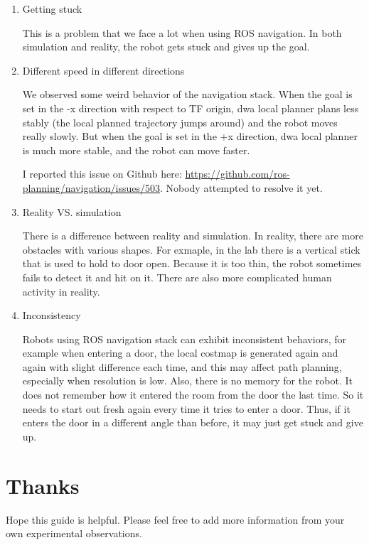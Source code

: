 \documentclass[12pt]{article}
\begin{document}
\begin{enumerate}
\item Getting stuck

This is a problem that we face a lot when using ROS navigation. In both simulation and reality, the robot gets stuck and gives up the goal. 

\item Different speed in different directions

We observed some weird behavior of the navigation stack. When the goal is set in the -x direction with respect to TF origin, dwa local planner plans less stably (the local planned trajectory jumps around) and the robot moves really slowly. But when the goal is set in the +x direction, dwa local planner is much more stable, and the robot can move faster.

I reported this issue on Github here: \url{https://github.com/ros-planning/navigation/issues/503}. Nobody attempted to resolve it yet.

\item Reality VS. simulation

There is a difference between reality and simulation. In reality, there are more obstacles with various shapes. For exmaple, in the lab there is a vertical stick that is used to hold to door
open. Because it is too thin, the robot sometimes fails to detect it and hit on it. There are also more complicated human activity in reality.

\item Inconsistency

Robots using ROS navigation stack can exhibit inconsistent behaviors, for example when entering a door, the local costmap is generated again and again with slight difference each time, and this may affect path planning, especially when resolution is low. Also, there is no memory for the robot. It does not remember how it entered the room from the door the last time. So it needs to start out fresh again every time it tries to enter a door. Thus, if it enters the door in a different angle than before, it may just get stuck and give up.

\end{enumerate}


\section*{Thanks}

Hope this guide is helpful. Please feel free to add more information from your own experimental observations.

\nocite{*}


\end{document}
